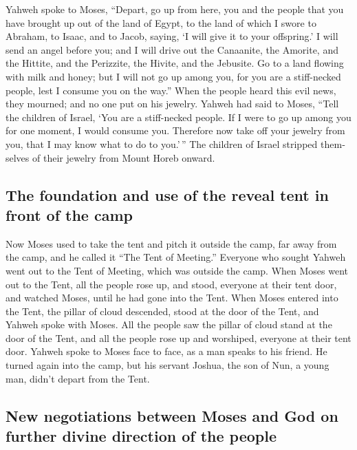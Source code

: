 \begin{paracol}{2}
\begin{otherlanguage}{english}
 Yahweh spoke to Moses, ``Depart, go up from here, you and
the people that you have brought up out of the land of Egypt, to the
land of which I swore to Abraham, to Isaac, and to Jacob, saying, `I
will give it to your offspring.'  I will send an angel
before you; and I will drive out the Canaanite, the Amorite, and the
Hittite, and the Perizzite, the Hivite, and the Jebusite. 
Go to a land flowing with milk and honey; but I will not go up among
you, for you are a stiff-necked people, lest I consume you on the way.''
 When the people heard this evil news, they mourned; and
no one put on his jewelry.  Yahweh had said to Moses,
``Tell the children of Israel, `You are a stiff-necked people. If I were
to go up among you for one moment, I would consume you. Therefore now
take off your jewelry from you, that I may know what to do to you.'\,''
 The children of Israel stripped themselves of their
jewelry from Mount Horeb onward.

\hypertarget{the-foundation-and-use-of-the-reveal-tent-in-front-of-the-camp}{%
\subsection{The foundation and use of the reveal tent in front of the
camp}\label{the-foundation-and-use-of-the-reveal-tent-in-front-of-the-camp}}

 Now Moses used to take the tent and pitch it outside the
camp, far away from the camp, and he called it ``The Tent of Meeting.''
Everyone who sought Yahweh went out to the Tent of Meeting, which was
outside the camp.  When Moses went out to the Tent, all
the people rose up, and stood, everyone at their tent door, and watched
Moses, until he had gone into the Tent.  When Moses
entered into the Tent, the pillar of cloud descended, stood at the door
of the Tent, and Yahweh spoke with Moses.  All the people
saw the pillar of cloud stand at the door of the Tent, and all the
people rose up and worshiped, everyone at their tent door.
 Yahweh spoke to Moses face to face, as a man speaks to
his friend. He turned again into the camp, but his servant Joshua, the
son of Nun, a young man, didn't depart from the Tent.

\hypertarget{new-negotiations-between-moses-and-god-on-further-divine-direction-of-the-people}{%
\subsection{New negotiations between Moses and God on further divine
direction of the
people}\label{new-negotiations-between-moses-and-god-on-further-divine-direction-of-the-people}}


\end{otherlanguage}
\end{paracol}

